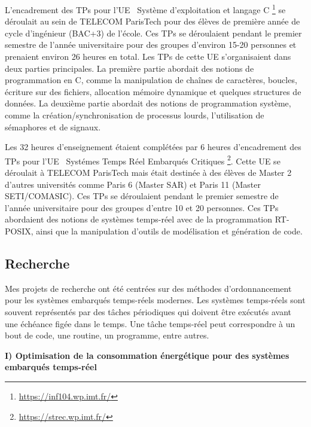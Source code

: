 \documentclass{article}
\begin{document}
L'encadrement des TPs pour l'UE \guillemotleft\ 
Système d'exploitation et langage C 
\guillemotright\footnote{\url{https://inf104.wp.imt.fr/}} se déroulait au sein de TELECOM ParisTech pour 
des 
élèves de première année de cycle d'ingénieur (BAC+3) de l'école. Ces TPs se déroulaient pendant le 
premier semestre de l'année universitaire pour des groupes d'environ 15-20 personnes et prenaient environ 
26 heures en total. Les TPs de cette UE s'organisaient dans deux parties principales. La première partie 
abordait des notions de programmation en C, comme la manipulation de chaînes de caractères, 
boucles, écriture sur des fichiers, allocation mémoire dynamique et quelques structures de données. La 
deuxième partie abordait des notions de programmation système, comme la création/synchronisation de 
processus lourds, l'utilisation de sémaphores et de signaux.
\vspace{.5cm}

Les 32 heures d'enseignement étaient complétées par 6 heures d'encadrement des TPs pour l'UE 
\guillemotleft\ Systémes Temps Réel Embarqués Critiques 
\guillemotright\footnote{\url{https://strec.wp.imt.fr/}}. Cette UE se déroulait à TELECOM ParisTech mais 
était destinée à des élèves de Master 2 d'autres universités comme Paris 6 (Master SAR) et Paris 11 (Master 
SETI/COMASIC). Ces TPs se déroulaient pendant le premier semestre de l'année universitaire pour des 
groupes d'entre 10 et 20 personnes. Ces TPs abordaient des notions de systèmes temps-réel avec de la 
programmation RT-POSIX, ainsi que la manipulation d'outils de modélisation et génération de code.

\subsection{Recherche}

Mes projets de recherche ont été centrées sur des méthodes d'ordonnancement pour les systèmes 
embarqués temps-réels modernes. Les systèmes temps-réels sont souvent représentés par des tâches 
périodiques qui doivent être exécutés avant une échéance figée dans le temps. Une 
tâche temps-réel peut correspondre à un bout de code, une routine, un programme, entre autres.
\vspace{.5cm}

\textbf{I) Optimisation de la consommation énergétique pour des systèmes embarqués temps-réel}
\vspace{.5cm}
\end{document}
